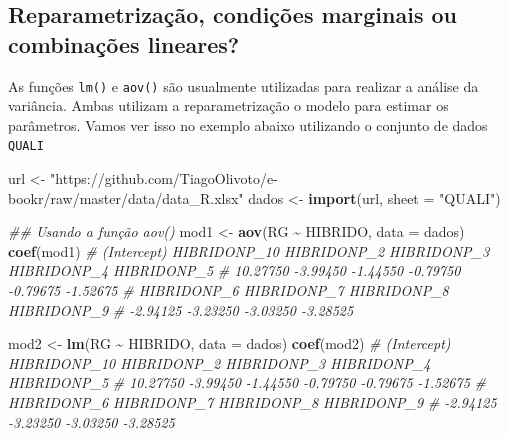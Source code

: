 \documentclass[
]{book}
\makeatletter
\newenvironment{Shaded}{\begin{snugshade}}{\end{snugshade}}
\newcommand{\CommentTok}[1]{\textcolor[rgb]{0.56,0.35,0.01}{\textit{#1}}}
\newcommand{\DataTypeTok}[1]{\textcolor[rgb]{0.13,0.29,0.53}{#1}}
\newcommand{\KeywordTok}[1]{\textcolor[rgb]{0.13,0.29,0.53}{\textbf{#1}}}
\newcommand{\NormalTok}[1]{#1}
\newcommand{\OperatorTok}[1]{\textcolor[rgb]{0.81,0.36,0.00}{\textbf{#1}}}
\newcommand{\StringTok}[1]{\textcolor[rgb]{0.31,0.60,0.02}{#1}}
\numberwithin{equation}{section}
\newcommand{\indf}[1]{\index[function]{#1@\texttt{#1()}|ST}}
\makeatother
\begin{document}
\hypertarget{reparametrizauxe7uxe3o-condiuxe7uxf5es-marginais-ou-combinauxe7uxf5es-lineares}{%
\subsection{Reparametrização, condições marginais ou combinações lineares?}\label{reparametrizauxe7uxe3o-condiuxe7uxf5es-marginais-ou-combinauxe7uxf5es-lineares}}

As funções \texttt{lm()} \indf{lm} e \texttt{aov()} \indf{aov} são usualmente utilizadas para realizar a análise da variância. Ambas utilizam a reparametrização o modelo para estimar os parâmetros. Vamos ver isso no exemplo abaixo utilizando o conjunto de dados \texttt{QUALI}

\begin{Shaded}
\begin{Highlighting}[]
\NormalTok{url \textless{}{-}}\StringTok{ "https://github.com/TiagoOlivoto/e{-}bookr/raw/master/data/data\_R.xlsx"}
\NormalTok{dados \textless{}{-}}\StringTok{ }\KeywordTok{import}\NormalTok{(url, }\DataTypeTok{sheet =} \StringTok{"QUALI"}\NormalTok{)}

\CommentTok{\#\# Usando a função aov()}
\NormalTok{mod1 \textless{}{-}}\StringTok{ }\KeywordTok{aov}\NormalTok{(RG }\OperatorTok{\textasciitilde{}}\StringTok{ }\NormalTok{HIBRIDO, }\DataTypeTok{data =}\NormalTok{ dados)}
\KeywordTok{coef}\NormalTok{(mod1)}
\CommentTok{\#  (Intercept) HIBRIDONP\_10  HIBRIDONP\_2  HIBRIDONP\_3  HIBRIDONP\_4  HIBRIDONP\_5 }
\CommentTok{\#     10.27750     {-}3.99450     {-}1.44550     {-}0.79750     {-}0.79675     {-}1.52675 }
\CommentTok{\#  HIBRIDONP\_6  HIBRIDONP\_7  HIBRIDONP\_8  HIBRIDONP\_9 }
\CommentTok{\#     {-}2.94125     {-}3.23250     {-}3.03250     {-}3.28525}

\NormalTok{mod2 \textless{}{-}}\StringTok{ }\KeywordTok{lm}\NormalTok{(RG }\OperatorTok{\textasciitilde{}}\StringTok{ }\NormalTok{HIBRIDO, }\DataTypeTok{data =}\NormalTok{ dados)}
\KeywordTok{coef}\NormalTok{(mod2)}
\CommentTok{\#  (Intercept) HIBRIDONP\_10  HIBRIDONP\_2  HIBRIDONP\_3  HIBRIDONP\_4  HIBRIDONP\_5 }
\CommentTok{\#     10.27750     {-}3.99450     {-}1.44550     {-}0.79750     {-}0.79675     {-}1.52675 }
\CommentTok{\#  HIBRIDONP\_6  HIBRIDONP\_7  HIBRIDONP\_8  HIBRIDONP\_9 }
\CommentTok{\#     {-}2.94125     {-}3.23250     {-}3.03250     {-}3.28525}


\end{Highlighting}
\end{Shaded}
\end{document}

